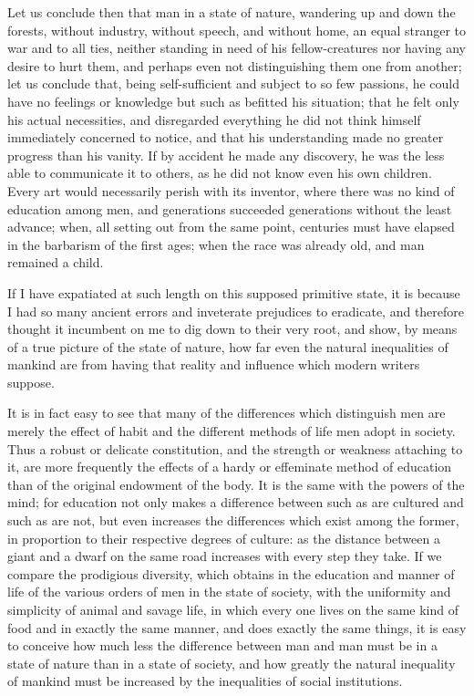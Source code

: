 \documentclass[12pt]{report}
\begin{document}
Let us conclude then that man in a state of nature, wandering up and down the forests, without industry, without speech, and without home, an equal stranger to war and to all ties, neither standing in need of his fellow-creatures nor having any desire to hurt them, and perhaps even not distinguishing them one from another; let us conclude that, being self-sufficient and subject to so few passions, he could have no feelings or knowledge but such as befitted his situation; that he felt only his actual necessities, and disregarded everything he did not think himself immediately concerned to notice, and that his understanding made no greater progress than his vanity. If by accident he made any discovery, he was the less able to communicate it to others, as he did not know even his own children. Every art would necessarily perish with its inventor, where there was no kind of education among men, and generations succeeded generations without the least advance; when, all setting out from the same point, centuries must have elapsed in the barbarism of the first ages; when the race was already old, and man remained a child.

If I have expatiated at such length on this supposed primitive state, it is because I had so many ancient errors and inveterate prejudices to eradicate, and therefore thought it incumbent on me to dig down to their very root, and show, by means of a true picture of the state of nature, how far even the natural inequalities of mankind are from having that reality and influence which modern writers suppose.

It is in fact easy to see that many of the differences which distinguish men are merely the effect of habit and the different methods of life men adopt in society. Thus a robust or delicate constitution, and the strength or weakness attaching to it, are more frequently the effects of a hardy or effeminate method of education than of the original endowment of the body. It is the same with the powers of the mind; for education not only makes a difference between such as are cultured and such as are not, but even increases the differences which exist among the former, in proportion to their respective degrees of culture: as the distance between a giant and a dwarf on the same road increases with every step they take. If we compare the prodigious diversity, which obtains in the education and manner of life of the various orders of men in the state of society, with the uniformity and simplicity of animal and savage life, in which every one lives on the same kind of food and in exactly the same manner, and does exactly the same things, it is easy to conceive how much less the difference between man and man must be in a state of nature than in a state of society, and how greatly the natural inequality of mankind must be increased by the inequalities of social institutions.
\end{document}
